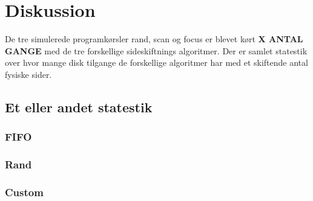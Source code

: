 \section{Diskussion}
De tre simulerede programkørsler rand, scan og focus er blevet kørt \textbf{X ANTAL GANGE} med de tre forskellige sideskiftnings algoritmer. Der er samlet statestik over hvor mange disk tilgange de forskellige algoritmer har med et skiftende antal fysiske sider.

\subsection{Et eller andet statestik}

\subsubsection{FIFO}

\subsubsection{Rand}

\subsubsection{Custom}